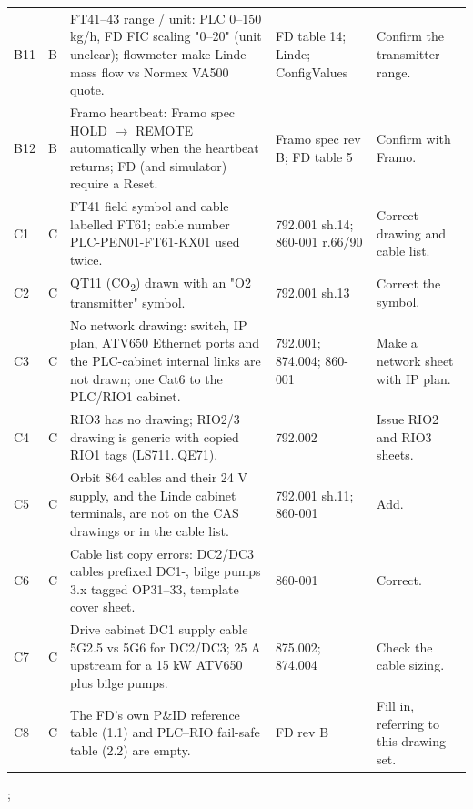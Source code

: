 {{\begin{tabular}{@{}p{8mm}p{4mm}p{120mm}p{100mm}p{90mm}@{}}
      B11 & B & FT41--43 range / unit: PLC 0--150 kg/h, FD FIC scaling "0--20" (unit unclear); flowmeter make Linde mass flow vs Normex VA500 quote. & FD table 14; Linde; ConfigValues & Confirm the transmitter range. \\
      B12 & B & Framo heartbeat: Framo spec HOLD $\rightarrow$ REMOTE automatically when the heartbeat returns; FD (and simulator) require a Reset. & Framo spec rev B; FD table 5 & Confirm with Framo. \\
      \midrule
      C1 & C & FT41 field symbol and cable labelled FT61; cable number PLC-PEN01-FT61-KX01 used twice. & 792.001 sh.14; 860-001 r.66/90 & Correct drawing and cable list. \\
      C2 & C & QT11 (CO\textsubscript{2}) drawn with an "O2 transmitter" symbol. & 792.001 sh.13 & Correct the symbol. \\
      C3 & C & No network drawing: switch, IP plan, ATV650 Ethernet ports and the PLC-cabinet internal links are not drawn; one Cat6 to the PLC/RIO1 cabinet. & 792.001; 874.004; 860-001 & Make a network sheet with IP plan. \\
      C4 & C & RIO3 has no drawing; RIO2/3 drawing is generic with copied RIO1 tags (LS711..QE71). & 792.002 & Issue RIO2 and RIO3 sheets. \\
      C5 & C & Orbit 864 cables and their 24 V supply, and the Linde cabinet terminals, are not on the CAS drawings or in the cable list. & 792.001 sh.11; 860-001 & Add. \\
      C6 & C & Cable list copy errors: DC2/DC3 cables prefixed DC1-, bilge pumps 3.x tagged OP31--33, template cover sheet. & 860-001 & Correct. \\
      C7 & C & Drive cabinet DC1 supply cable 5G2.5 vs 5G6 for DC2/DC3; 25 A upstream for a 15 kW ATV650 plus bilge pumps. & 875.002; 874.004 & Check the cable sizing. \\
      C8 & C & The FD's own P\&ID reference table (1.1) and PLC--RIO fail-safe table (2.2) are empty. & FD rev B & Fill in, referring to this drawing set. \\
      \bottomrule
    \end{tabular}};
}
